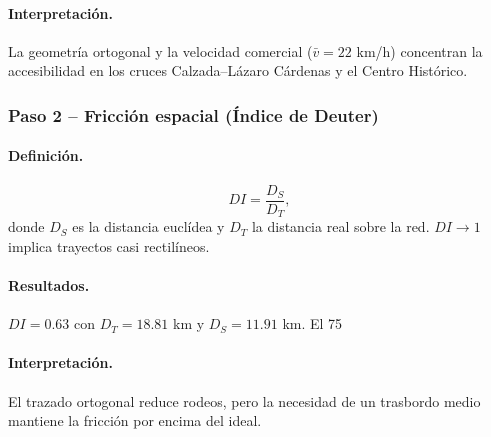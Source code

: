 \documentclass[openany]{book}
\begin{document}
		\paragraph{Interpretación.} La geometría ortogonal y la velocidad comercial ($\bar v=22$ km/h) concentran la accesibilidad en los cruces Calzada–Lázaro Cárdenas y el Centro Histórico.

		\subsubsection*{Paso 2 – Fricción espacial (Índice de Deuter)}
		\paragraph{Definición.}
		\[
		DI=\frac{D_S}{D_T},
		\]
		donde $D_S$ es la distancia euclídea y $D_T$ la distancia real sobre la red. $DI\!\to\!1$ implica trayectos casi rectilíneos.

		\paragraph{Resultados.} $DI=0.63$ con $D_T=18.81$ km y $D_S=11.91$ km. El 75 %

		\paragraph{Interpretación.} El trazado ortogonal reduce rodeos, pero la necesidad de un trasbordo medio mantiene la fricción por encima del ideal.
\end{document}
